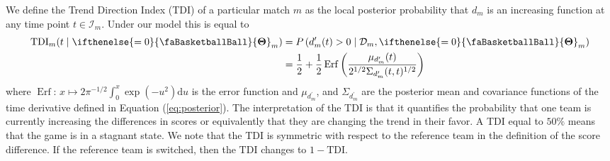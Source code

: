 \documentclass[
  11pt,
]{svjour3}
\theoremstyle{nonumberplain}
\begin{document}
We define the Trend Direction Index (TDI) of a particular match \(m\) as
the local posterior probability that \(d_m\) is an increasing function
at any time point \(t \in \mathcal{I}_m\). Under our model this is equal
to \begin{align}
\begin{split}
  \textrm{TDI}_m(t \mid \ifthenelse{\value{bbsym4theta}=0}{\text{\faBasketballBall}}{\mathbf{\Theta}}_m) &= P\left(d_m^\prime(t) > 0 \mid \mathcal{D}_m, \ifthenelse{\value{bbsym4theta}=0}{\text{\faBasketballBall}}{\mathbf{\Theta}}_m\right)\\
     &= \frac{1}{2} + \frac{1}{2}\mathop{\mathrm{Erf}}\left(\frac{\mu_{d_m^\prime}(t)}{2^{1/2}\Sigma_{d_m^\prime}(t, t)^{1/2}}\right)
\end{split}
\label{eq:TDIdef}
\end{align} where
\(\mathop{\mathrm{Erf}}\colon\, x \mapsto 2\pi^{-1/2}\int_0^x \exp(-u^2)\mathrm{d}u\)
is the error function and \(\mu_{d_m^\prime}\), and
\(\Sigma_{d_m^\prime}\) are the posterior mean and covariance functions
of the time derivative defined in Equation (\ref{eq:posterior}). The
interpretation of the TDI is that it quantifies the probability that one
team is currently increasing the differences in scores or equivalently
that they are changing the trend in their favor. A TDI equal to \(50\%\)
means that the game is in a stagnant state. We note that the TDI is
symmetric with respect to the reference team in the definition of the
score difference. If the reference team is switched, then the
\(\textrm{TDI}\) changes to \(1 - \textrm{TDI}\).
\end{document}
